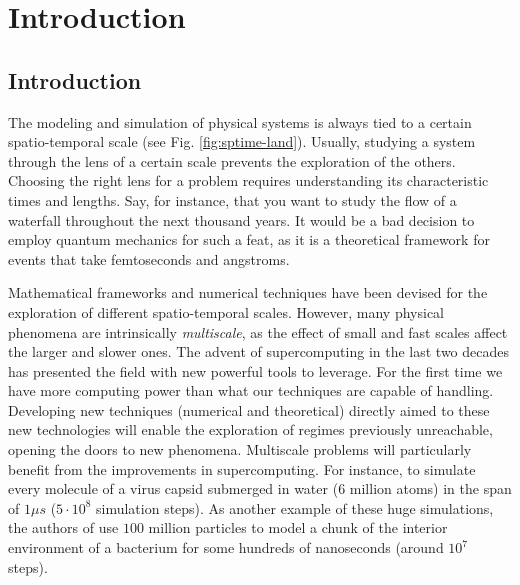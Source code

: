 \documentclass[twoside,openright,titlepage,numbers=noenddot,%
headinclude,footinclude,cleardoublepage=empty,abstract=on,
BCOR=5mm,fontsize=11pt, dvipsnames, paper=b5
]{scrreprt}
\begin{document}
    \printglossary[type=\acronymtype,nonumberlist]
\endgroup
\glsresetall
\newpage
\cleardoublepage
\pagestyle{scrheadings}
\cleardoublepage
\part{Introduction}\label{pt:intro}
\chapter{Introduction}\label{ch:introduction}

The modeling and simulation of physical systems is always tied to a certain spatio-temporal scale (see Fig. \ref{fig:sptime-land}). Usually, studying a system through the lens of a certain scale prevents the exploration of the others.
Choosing the right lens for a problem requires understanding its characteristic times and lengths.
Say, for instance, that you want to study the flow of a waterfall throughout the next thousand years. It would be a bad decision to employ quantum mechanics for such a feat, as it is a theoretical framework for events that take femtoseconds and angstroms.

Mathematical frameworks and numerical techniques have been devised for the exploration of different spatio-temporal scales. However, many physical phenomena are intrinsically \emph{multiscale}, as the effect of small and fast scales affect the larger and slower ones.
The advent of supercomputing in the last two decades has presented the field with new powerful tools to leverage. For the first time we have more computing power than what our techniques are capable of handling. 
Developing new techniques (numerical and theoretical) directly aimed to these new technologies will enable the exploration of regimes previously unreachable, opening the doors to new phenomena.
Multiscale problems will particularly benefit from the improvements in supercomputing.
For instance, \cite{Hadden2018} to simulate every molecule of a virus capsid submerged in water ($6$ million atoms) in the span of $1\mu s$ ($5\cdot10^8$ simulation steps).
As another example of these huge simulations, the authors of \cite{Rochaix2019} use $100$ million particles to model a chunk of the interior environment of a bacterium for some hundreds of nanoseconds (around $10^7$ steps).
\end{document}
